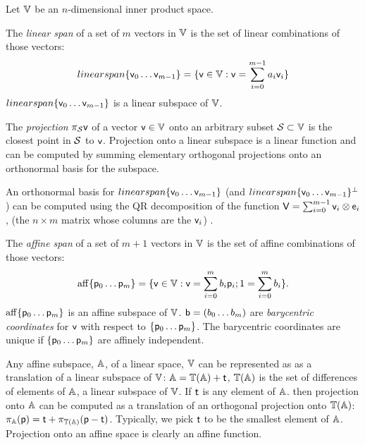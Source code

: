 \label{sec:spans-and-projections}

Let $\mathbb{V}$ be an $n$-dimensional inner product space.

The {\it linear span} of a set of $m$ vectors in $\mathbb{V}$
is the set of linear combinations of those vectors:
\begin{equation}
\\linearspan\{ \mathsf{v}_0 \ldots \mathsf{v}_{m-1} \} = \{\mathsf{v} \in \mathbb{V} : \mathsf{v} = \sum_{i=0}^{m-1} a_i \mathsf{v}_i\}
\end{equation}
$\\linearspan\{ \mathsf{v}_0 \ldots \mathsf{v}_{m-1} \}$ is a linear subspace of $\mathbb{V}$.

The {\it projection} $\pi_{\mathcal{S}} \mathsf{v}$ of a vector $\mathsf{v} \in \mathbb{V}$
onto an arbitrary subset $\mathcal{S} \subset \mathbb{V}$
is the closest point in $\mathcal{S}$ to $\mathsf{v}$.
Projection onto a linear subspace is a linear function and
can be computed by summing
elementary orthogonal projections onto an orthonormal basis for the subspace.

An orthonormal basis for $\\linearspan\{ \mathsf{v}_0 \ldots \mathsf{v}_{m-1} \}$
(and $\\linearspan\{ \mathsf{v}_0 \ldots \mathsf{v}_{m-1} \}^\perp$)
can be computed using the QR decomposition
of the function $\mathsf{V} = \sum_{i=0}^{m-1} \mathsf{v}_i \otimes \mathsf{e}_i$,
(the $n \times m$ matrix whose columns are the $\mathsf{v}_i$)
\cite[See][sec. 5.2 ]{golub-vanloan-2012}.

The {\it affine span} of a set of $m+1$ vectors in $\mathbb{V}$
is the set of affine combinations of those vectors:
\begin{equation}
\mathrm{aff}\{ \mathsf{p}_0 \ldots \mathsf{p}_{m} \} = \{\mathsf{v} \in \mathbb{V} : \mathsf{v} = \sum_{i=0}^{m} b_i \mathsf{p}_i;
1 = \sum_{i=0}^{m} b_i \}.
\end{equation}
$\mathrm{aff}\{ \mathsf{p}_0 \ldots \mathsf{p}_{m} \}$ is an affine subspace of $\mathbb{V}$.
$\mathsf{b} = ( b_0 \ldots b_m )$ are {\it barycentric coordinates}
for $\mathsf{v}$ with respect to $\{ \mathsf{p}_0 \ldots \mathsf{p}_{m} \}$.
The barycentric coordinates are unique if $\{ \mathsf{p}_0 \ldots \mathsf{p}_{m} \}$
are affinely independent.

Any affine subspace, $\mathbb{A}$, of a linear space, $\mathbb{V}$ can be represented as
as a translation of a linear subspace of $\mathbb{V}$:
$\mathbb{A} = \mathbb{T}(\mathbb{A}) + \mathsf{t}$,
$\mathbb{T}(\mathbb{A})$ is the set of differences of elements of $\mathbb{A}$,
a linear subspace of $\mathbb{V}$.
If $\mathsf{t}$ is any element of $\mathbb{A}$.
then projection onto $\mathbb{A}$
can be computed as a translation of an orthogonal projection onto $\mathbb{T}(\mathbb{A})$:
$\pi_{\mathbb{A}} (\mathsf{p}) = \mathsf{t} + \pi_{\mathbb{T}(\mathbb{A})} (\mathsf{p} - \mathsf{t})$.
Typically, we pick $\mathsf{t}$ to be the smallest element of $\mathbb{A}$.
Projection onto an affine space is clearly an affine function.

